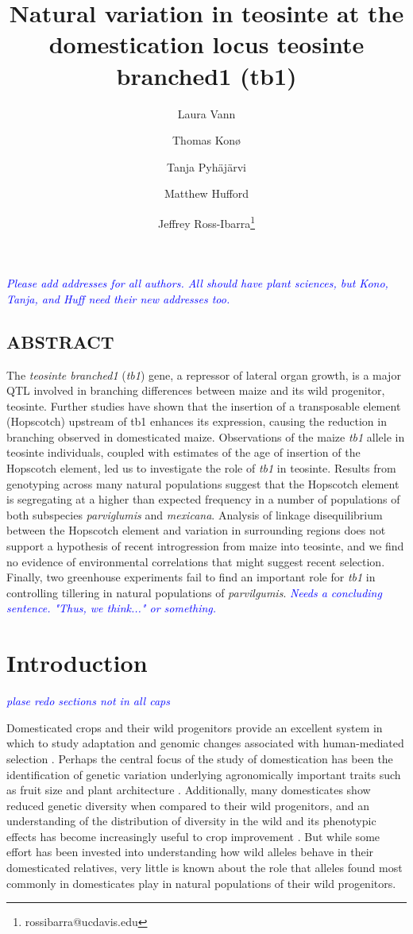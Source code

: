 \documentclass[12pt]{article}
\title{Natural variation in teosinte at the domestication locus teosinte branched1 (tb1)}
\author[1]{Laura Vann}
\author[1]{Thomas Kon\o}
\author[1]{Tanja Pyh\"aj\"arvi}
\author[1]{Matthew Hufford}
\author[1,2]{Jeffrey Ross-Ibarra\thanks{rossibarra@ucdavis.edu}}
\affil[1]{Department of Plant Sciences, University of California Davis}
\affil[2]{Center for Population Biology and Genome Center, University of California Davis}
\date{}
\newcommand{\jri}[1]{\textcolor{blue}{ \emph{\scriptsize  #1}} }
\begin{document}
\maketitle

\jri{Please add addresses for all authors.  All should have plant sciences, but Kono, Tanja, and Huff need their new addresses too. }

\subsection*{ABSTRACT}

The \emph{teosinte branched1} (\emph{tb1}) gene, a repressor of lateral organ growth, is a major QTL involved in branching differences between maize and its wild progenitor, teosinte. Further studies have shown that the insertion of a transposable element (Hopscotch) upstream of tb1 enhances its expression, causing the reduction in branching observed in domesticated maize. Observations of the maize \emph{tb1} allele in teosinte individuals, coupled with estimates of the age of insertion of the Hopscotch element, led us to investigate the role of \emph{tb1} in teosinte. Results from genotyping across many natural populations suggest that the Hopscotch element is segregating at a higher than expected frequency in a number of populations of both subspecies \emph{parviglumis} and \emph{mexicana}. Analysis of linkage disequilibrium between the Hopscotch element and variation in surrounding regions does not support a hypothesis of recent introgression from maize into teosinte, and we find no evidence of environmental correlations that might suggest recent selection.  Finally, two greenhouse experiments fail to find an important role for \emph{tb1} in controlling tillering in natural populations of \emph{parvilgumis}. \jri{Needs a concluding sentence. "Thus, we think..." or something.} 


\section*{Introduction}
\jri{plase redo sections not in all caps}

Domesticated crops and their wild progenitors provide an excellent system in which to study adaptation and genomic changes associated with human-mediated selection \cite{Ross-Ibarra et al 2007}. Perhaps the central focus of the study of domestication has been the identification of genetic variation underlying agronomically important traits such as fruit size and plant architecture \cite{Olsen and Gross 2010}. Additionally, many domesticates show reduced genetic diversity when compared to their wild progenitors, and an understanding of the distribution of diversity in the wild and its phenotypic effects has become increasingly useful to crop improvement \cite{Kovach and McCouch 2008}. But while some effort has been invested into understanding how wild alleles behave in their domesticated relatives, very little is known about the role that alleles found most commonly in domesticates play in natural populations of their wild progenitors.
\end{document}
